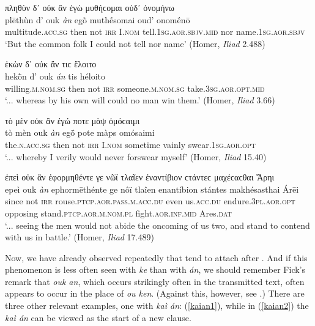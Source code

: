 \begin{exe}
\ex πληθὺν δ᾽ οὐκ ἂν ἐγὼ μυθήϲομαι οὐδ᾽ ὀνομήνω\\
\gll plēthùn d' ouk \emph{àn} egṑ muthḗsomai oud' onomḗnō\\
multitude.\textsc{acc.sg} then not \textsc{irr} I.\textsc{nom}
tell.\textsc{1sg.aor.sbjv.mid} nor name.\textsc{1sg.aor.sbjv}\\
\trans `But the common folk I could not tell nor name' (Homer, \textit{Iliad} 2.488)
\label{ouk6}
\end{exe}

\begin{exe}
\ex ἑκὼν δ᾽ οὐκ ἄν τιϲ ἕλοιτο\\
\gll hekṑn d' ouk \emph{án} tis héloito\\
willing.\textsc{m.nom.sg} then not \textsc{irr}
someone.\textsc{m.nom.sg} take.\textsc{3sg.aor.opt.mid}\\
\trans `... whereas by his own will could no man win them.' (Homer, \textit{Iliad} 3.66)
\label{ouk7}
\end{exe}

\begin{exe}
\ex τὸ μὲν οὐκ ἂν ἐγώ ποτε μὰψ ὀμόϲαιμι\\
\gll tò mèn ouk \emph{àn} egṓ pote màps omósaimi\\
the.\textsc{n.acc.sg} then not \textsc{irr} I.\textsc{nom} sometime
vainly swear.\textsc{1sg.aor.opt}\\
\trans `... whereby I verily would never forswear myself' (Homer, \textit{Iliad} 15.40)
\label{ouk8}
\end{exe}

\begin{exe}
\ex ἐπεὶ οὐκ ἂν ἐφορμηθέντε γε νῶϊ τλαῖεν ἐναντίβιον ϲτάντεϲ μαχέϲαϲθαι Ἄρηι\\
\gll epeì ouk \emph{àn} ephormēthénte ge nôï tlaîen enantíbion stántes makhésasthai Árēi\\
since not \textsc{irr} rouse.\textsc{ptcp.aor.pass.m.acc.du} even us.\textsc{acc.du} endure.\textsc{3pl.aor.opt} opposing stand.\textsc{ptcp.aor.m.nom.pl} fight.\textsc{aor.inf.mid} Ares.\textsc{dat}\\
\trans `... seeing the men would not abide the oncoming of us two, and stand to contend with us in battle.' (Homer, \textit{Iliad} 17.489)
\label{ouk9}
\end{exe}

Now, we have already observed repeatedly that  tend to attach after . And if this phenomenon is less often seen with \emph{ke} than with \emph{án}, we should remember Fick's \citeyearpar[xxiii]{Fick1886} remark that \emph{ouk an}, which occurs strikingly often in the transmitted text, often appears to occur in the place of \emph{ou ken}. (Against this, however, see \citealp[330]{Monro1891}.) There are three other relevant examples, one with \textit{kaì án}: (\ref{kaian1}), while in (\ref{kaian2}) the \textit{kaì án} can be viewed as the start of a new clause.

